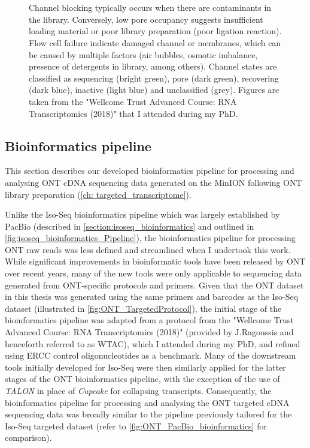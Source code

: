 \begin{figure}[]
{	\\ \\
	Channel blocking typically occurs when there are contaminants in the library. Conversely, low pore occupancy suggests insufficient loading material or poor library preparation (poor ligation reaction). Flow cell failure indicate damaged channel or membranes, which can be caused by multiple factors (air bubbles, osmotic imbalance, presence of detergents in library, among others). Channel states are classified as sequencing (bright green), pore (dark green), recovering (dark blue), inactive (light blue) and unclassified (grey). Figures are taken from the "Wellcome Trust Advanced Course: RNA Transcriptomics (2018)" that I attended during my PhD.}
	\label{fig:ONTPoreOccupancy}
\end{figure}

\clearpage
\subsection{Bioinformatics pipeline}
\label{section:ont_bioinformatics}
This section describes our developed bioinformatics pipeline for processing and analysing ONT cDNA sequencing data generated on the MinION following ONT library preparation (\cref{ch: targeted_transcriptome}). 

Unlike the Iso-Seq bioinformatics pipeline which was largely established by PacBio (described in \cref{section:isoseq_bioinformatics} and outlined in \cref{fig:isoseq_bioinformatics_Pipeline}), the bioinformatics pipeline for processing ONT raw reads was less defined and streamlined when I undertook this work. While significant improvements in bioinformatic tools have been released by ONT over recent years, many of the new tools were only applicable to sequencing data generated from ONT-specific protocols and primers. Given that the ONT dataset in this thesis was generated using the same primers and barcodes as the Iso-Seq dataset (illustrated in \cref{fig:ONT_TargetedProtocol}), the initial stage of the bioinformatics pipeline was adapted from a protocol from the "Wellcome Trust Advanced Course: RNA Transcriptomics (2018)" (provided by J.Ragoussis and henceforth referred to as WTAC), which I attended during my PhD, and refined using ERCC control oligonucleotides as a benchmark. Many of the downstream tools initially developed for Iso-Seq were then similarly applied for the latter stages of the ONT bioinformatics pipeline, with the exception of the use of \textit{TALON} in place of \textit{Cupcake} for collapsing transcripts.  Consequently, the bioinformatics pipeline for processing and analysing the ONT targeted cDNA sequencing data was broadly similar to the pipeline previously tailored for the Iso-Seq targeted dataset (refer to \cref{fig:ONT_PacBio_bioinformatics} for comparison). 

